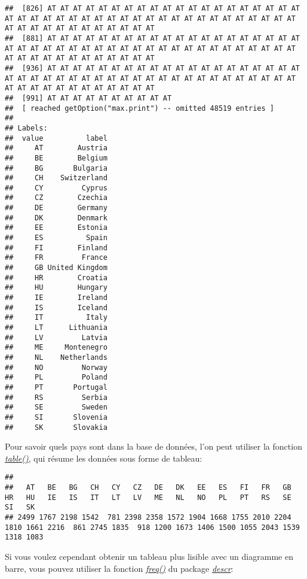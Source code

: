 \documentclass[
]{book}
\newenvironment{Shaded}{\begin{snugshade}}{\end{snugshade}}
\newcommand{\FunctionTok}[1]{\textcolor[rgb]{0.00,0.00,0.00}{#1}}
\newcommand{\NormalTok}[1]{#1}
\newcommand{\SpecialCharTok}[1]{\textcolor[rgb]{0.00,0.00,0.00}{#1}}
\begin{document}
\begin{verbatim}
##  [826] AT AT AT AT AT AT AT AT AT AT AT AT AT AT AT AT AT AT AT AT AT AT AT AT AT AT AT AT AT AT AT AT AT AT AT AT AT AT AT AT AT AT AT AT AT AT AT AT AT AT AT AT AT AT AT
##  [881] AT AT AT AT AT AT AT AT AT AT AT AT AT AT AT AT AT AT AT AT AT AT AT AT AT AT AT AT AT AT AT AT AT AT AT AT AT AT AT AT AT AT AT AT AT AT AT AT AT AT AT AT AT AT AT
##  [936] AT AT AT AT AT AT AT AT AT AT AT AT AT AT AT AT AT AT AT AT AT AT AT AT AT AT AT AT AT AT AT AT AT AT AT AT AT AT AT AT AT AT AT AT AT AT AT AT AT AT AT AT AT AT AT
##  [991] AT AT AT AT AT AT AT AT AT AT
##  [ reached getOption("max.print") -- omitted 48519 entries ]
## 
## Labels:
##  value          label
##     AT        Austria
##     BE        Belgium
##     BG       Bulgaria
##     CH    Switzerland
##     CY         Cyprus
##     CZ        Czechia
##     DE        Germany
##     DK        Denmark
##     EE        Estonia
##     ES          Spain
##     FI        Finland
##     FR         France
##     GB United Kingdom
##     HR        Croatia
##     HU        Hungary
##     IE        Ireland
##     IS        Iceland
##     IT          Italy
##     LT      Lithuania
##     LV         Latvia
##     ME     Montenegro
##     NL    Netherlands
##     NO         Norway
##     PL         Poland
##     PT       Portugal
##     RS         Serbia
##     SE         Sweden
##     SI       Slovenia
##     SK       Slovakia
\end{verbatim}

Pour savoir quels pays sont dans la base de données, l'on peut utiliser la fonction \href{https://www.rdocumentation.org/packages/base/versions/3.6.2/topics/table}{\emph{table()}}, qui résume les données sous forme de tableau:

\begin{Shaded}
\end{Shaded}

\begin{verbatim}
## 
##   AT   BE   BG   CH   CY   CZ   DE   DK   EE   ES   FI   FR   GB   HR   HU   IE   IS   IT   LT   LV   ME   NL   NO   PL   PT   RS   SE   SI   SK 
## 2499 1767 2198 1542  781 2398 2358 1572 1904 1668 1755 2010 2204 1810 1661 2216  861 2745 1835  918 1200 1673 1406 1500 1055 2043 1539 1318 1083
\end{verbatim}

Si vous voulez cependant obtenir un tableau plus lisible avec un diagramme en barre, vous pouvez utiliser la fonction \href{https://www.rdocumentation.org/packages/descr/versions/1.1.5/topics/freq}{\emph{freq()}} du package \href{https://cran.r-project.org/web/packages/descr/index.html}{\emph{descr}}:
\end{document}
